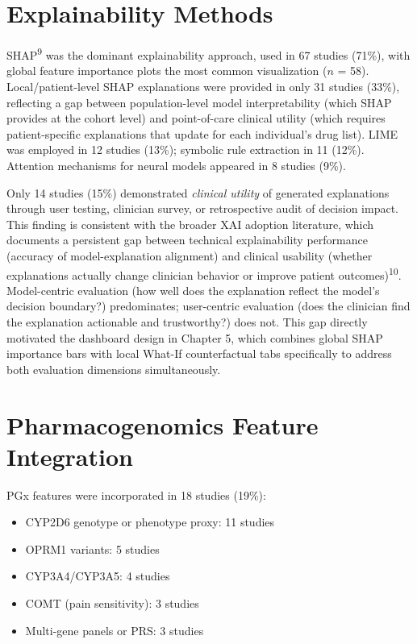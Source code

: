 \documentclass[
  12pt,
]{book}
\providecommand{\tightlist}{%
  \setlength{\itemsep}{0pt}\setlength{\parskip}{0pt}}
\begin{document}
\section{Explainability Methods}\label{explainability-methods}

SHAP\textsuperscript{9} was the dominant explainability approach, used
in 67 studies (71\%), with global feature importance plots the most
common visualization (\(n\) = 58). Local/patient-level SHAP explanations
were provided in only 31 studies (33\%), reflecting a gap between
population-level model interpretability (which SHAP provides at the
cohort level) and point-of-care clinical utility (which requires
patient-specific explanations that update for each individual's drug
list). LIME was employed in 12 studies (13\%); symbolic rule extraction
in 11 (12\%). Attention mechanisms for neural models appeared in 8
studies (9\%).

Only 14 studies (15\%) demonstrated \emph{clinical utility} of generated
explanations through user testing, clinician survey, or retrospective
audit of decision impact. This finding is consistent with the broader
XAI adoption literature, which documents a persistent gap between
technical explainability performance (accuracy of model-explanation
alignment) and clinical usability (whether explanations actually change
clinician behavior or improve patient outcomes)\textsuperscript{10}.
Model-centric evaluation (how well does the explanation reflect the
model's decision boundary?) predominates; user-centric evaluation (does
the clinician find the explanation actionable and trustworthy?) does
not. This gap directly motivated the dashboard design in Chapter 5,
which combines global SHAP importance bars with local What-If
counterfactual tabs specifically to address both evaluation dimensions
simultaneously.

\section{Pharmacogenomics Feature
Integration}\label{pharmacogenomics-feature-integration}

PGx features were incorporated in 18 studies (19\%):

\begin{itemize}
\tightlist
\item
  CYP2D6 genotype or phenotype proxy: 11 studies
\item
  OPRM1 variants: 5 studies
\item
  CYP3A4/CYP3A5: 4 studies
\item
  COMT (pain sensitivity): 3 studies
\item
  Multi-gene panels or PRS: 3 studies
\end{itemize}
\end{document}
